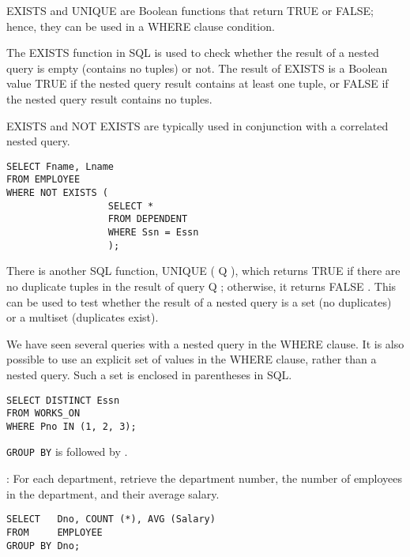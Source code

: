     \par EXISTS and UNIQUE are Boolean functions that return TRUE or FALSE; hence, they can be used in a WHERE clause condition.
    \par The EXISTS function in SQL is used to check whether the result of a nested query is empty (contains no tuples) or not. The result of EXISTS is a Boolean value TRUE if the nested query result contains at least one tuple, or FALSE if the nested query result contains no tuples.
    \par EXISTS and NOT EXISTS are typically used in conjunction with a correlated nested
query.
      \begin{lstlisting}
SELECT Fname, Lname
FROM EMPLOYEE
WHERE NOT EXISTS (
                  SELECT *
                  FROM DEPENDENT
                  WHERE Ssn = Essn
                  );
      \end{lstlisting}
\par There is another SQL function, UNIQUE ( Q ), which returns TRUE if there are no
duplicate tuples in the result of query Q ; otherwise, it returns FALSE . This can be
used to test whether the result of a nested query is a set (no duplicates) or a multiset
(duplicates exist).

\par We have seen several queries with a nested query in the WHERE clause. It is also possible to use an explicit set of values in the WHERE clause, rather than a nested query. Such a set is enclosed in parentheses in SQL.

\begin{lstlisting}
SELECT DISTINCT Essn
FROM WORKS_ON
WHERE Pno IN (1, 2, 3);
\end{lstlisting}

    \par \lstinline{GROUP BY} is followed by .
    \par {}: For each department, retrieve the department number, the number of employees in the department, and their average salary.
    \begin{lstlisting}
SELECT   Dno, COUNT (*), AVG (Salary)
FROM     EMPLOYEE
GROUP BY Dno;
    \end{lstlisting}

